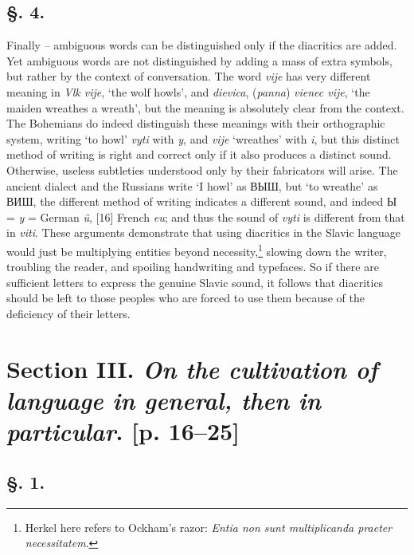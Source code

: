 \subsection*{\hspace*{\fill}§. 4.\hspace*{\fill}}

Finally -- ambiguous words can be distinguished only if the diacritics are added. Yet ambiguous words are not distinguished by adding a mass of extra symbols, but rather by the context of conversation. The word \textit{vije} has very different meaning in \textit{Vlk vije}, ‘the wolf howls’, and \textit{dievica}, (\textit{panna}) \textit{vienec vije}, ‘the maiden wreathes a wreath’, but the meaning is absolutely clear from the context. The Bohemians do indeed distinguish these meanings with their orthographic system, writing ‘to howl’ \textit{vyti} with \textit{y}, and \textit{vije} ‘wreathes’ with \textit{i}, but this distinct method of writing is right and correct only if it also produces a distinct sound. Otherwise, useless subtleties understood only by their fabricators will arise. The ancient dialect and the Russians write ‘I howl’ as ВЫШ, but ‘to wreathe’ as ВИШ, the different method of writing indicates a different sound, and indeed Ы = \textit{y} = German \textit{ü}, [16] French \textit{eu}; and thus the sound of \textit{vyti} is different from that in \textit{viti}. These arguments demonstrate that using diacritics in the Slavic language would just be multiplying entities beyond necessity,\footnote{Herkel here refers to Ockham’s razor: \textit{Entia non sunt multiplicanda praeter necessitatem}.} slowing down the writer, troubling the reader, and spoiling handwriting and typefaces. So if there are sufficient letters to express the genuine Slavic sound, it follows that diacritics should be left to those peoples who are forced to use them because of the deficiency of their letters.

\section*{Section III. \textit{On the cultivation of language in general, then in particular}. [p. 16--25]}
\label{sec:3-3}

\subsection*{\hspace*{\fill}§. 1.\hspace*{\fill}}

